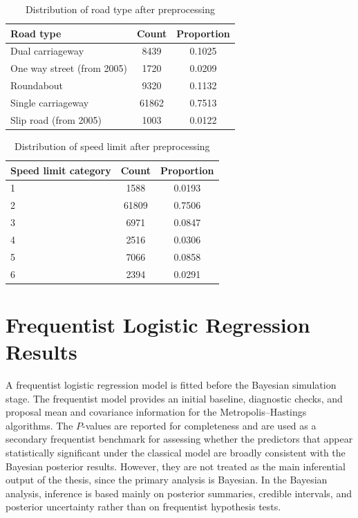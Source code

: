 \begin{table}[htbp]
\centering
\caption{Distribution of road type after preprocessing}
\label{tab:road_type_distribution}
\begin{tabular}{lcc}
\hline
Road type & Count & Proportion \\
\hline
Dual carriageway & 8439 & 0.1025 \\
One way street (from 2005) & 1720 & 0.0209 \\
Roundabout & 9320 & 0.1132 \\
Single carriageway & 61862 & 0.7513 \\
Slip road (from 2005) & 1003 & 0.0122 \\
\hline
\end{tabular}
\end{table}

\begin{table}[htbp]
\centering
\caption{Distribution of speed limit after preprocessing}
\label{tab:speed_limit_distribution}
\begin{tabular}{lcc}
\hline
Speed limit category & Count & Proportion \\
\hline
1 & 1588 & 0.0193 \\
2 & 61809 & 0.7506 \\
3 & 6971 & 0.0847 \\
4 & 2516 & 0.0306 \\
5 & 7066 & 0.0858 \\
6 & 2394 & 0.0291 \\
\hline
\end{tabular}
\end{table}

\section{Frequentist Logistic Regression Results}

A frequentist logistic regression model is fitted before the Bayesian simulation stage. The frequentist model provides an initial baseline, diagnostic checks, and proposal mean and covariance information for the Metropolis--Hastings algorithms. The $P$-values are reported for completeness and are used as a secondary frequentist benchmark for assessing whether the predictors that appear statistically significant under the classical model are broadly consistent with the Bayesian posterior results. However, they are not treated as the main inferential output of the thesis, since the primary analysis is Bayesian. In the Bayesian analysis, inference is based mainly on posterior summaries, credible intervals, and posterior uncertainty rather than on frequentist hypothesis tests.

